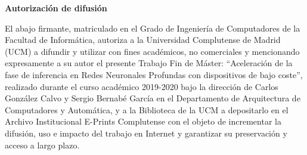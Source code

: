 \newpage
\thispagestyle{empty}
\begin{center}
{\bf \Huge Autorización de difusión}
\end{center}
\vspace{1cm}
\setlength{\baselineskip}{0.8cm}

El abajo firmante, matriculado en el Grado de Ingeniería de Computadores de la Facultad de
Informática, autoriza a la Universidad Complutense de Madrid (UCM) a difundir y utilizar
con fines académicos, no comerciales y mencionando expresamente a su autor el presente
Trabajo Fin de Máster: “Aceleración de la fase de inferencia en Redes Neuronales Profundas
con dispositivos de bajo coste”, realizado durante el curso académico 2019-2020 bajo la
dirección de Carlos González Calvo y Sergio Bernabé García en el Departamento
de Arquitectura de Computadores y Automática, y a la Biblioteca de la UCM a depositarlo
en el Archivo Institucional E-Prints Complutense con el objeto de incrementar la difusión,
uso e impacto del trabajo en Internet y garantizar su preservación y acceso a largo plazo.
\textit{}